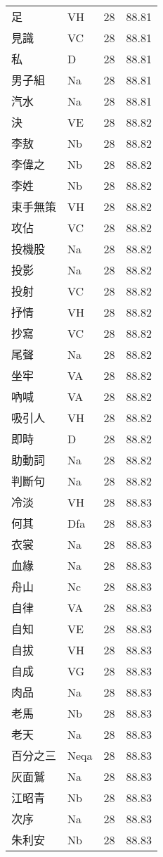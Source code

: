 \documentclass[twocolumn]{book}
\begin{document}
\begin{supertabular}{llrr}
足 & VH & 28 &  88.81\\
見識 & VC & 28 &  88.81\\
私 & D & 28 &  88.81\\
男子組 & Na & 28 &  88.81\\
汽水 & Na & 28 &  88.81\\
決 & VE & 28 &  88.82\\
李敖 & Nb & 28 &  88.82\\
李偉之 & Nb & 28 &  88.82\\
李姓 & Nb & 28 &  88.82\\
束手無策 & VH & 28 &  88.82\\
攻佔 & VC & 28 &  88.82\\
投機股 & Na & 28 &  88.82\\
投影 & Na & 28 &  88.82\\
投射 & VC & 28 &  88.82\\
抒情 & VH & 28 &  88.82\\
抄寫 & VC & 28 &  88.82\\
尾聲 & Na & 28 &  88.82\\
坐牢 & VA & 28 &  88.82\\
吶喊 & VA & 28 &  88.82\\
吸引人 & VH & 28 &  88.82\\
即時 & D & 28 &  88.82\\
助動詞 & Na & 28 &  88.82\\
判斷句 & Na & 28 &  88.82\\
冷淡 & VH & 28 &  88.83\\
何其 & Dfa & 28 &  88.83\\
衣裳 & Na & 28 &  88.83\\
血緣 & Na & 28 &  88.83\\
舟山 & Nc & 28 &  88.83\\
自律 & VA & 28 &  88.83\\
自知 & VE & 28 &  88.83\\
自拔 & VH & 28 &  88.83\\
自成 & VG & 28 &  88.83\\
肉品 & Na & 28 &  88.83\\
老馬 & Nb & 28 &  88.83\\
老天 & Na & 28 &  88.83\\
百分之三 & Neqa & 28 &  88.83\\
灰面鷲 & Na & 28 &  88.83\\
江昭青 & Nb & 28 &  88.83\\
次序 & Na & 28 &  88.83\\
朱利安 & Nb & 28 &  88.83\\

\end{supertabular}
\end{document}
